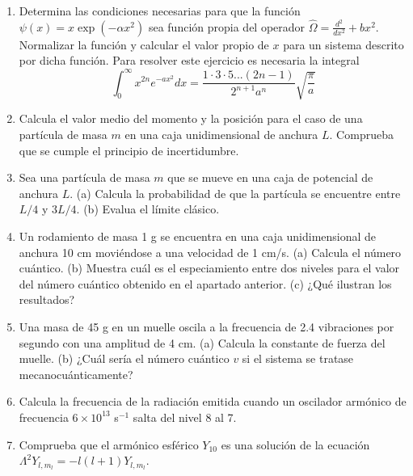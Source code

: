 \documentclass{tufte-handout}
\begin{document}
\begin{enumerate}
   \item Determina las condiciones necesarias 
   para que la función $\psi(x)=x\exp(-\alpha
   x^2)$ sea función propia del operador 
   $\hat{\Omega}=\frac{d^2}{dx^2} + bx^2$.
   Normalizar la función y calcular el valor 
   propio de $x$ para un
   sistema descrito por dicha función. Para resolver
   este ejercicio es necesaria la integral
   \begin{equation}
       \int_0^{\infty}x^{2n}e^{-ax^2}dx = 
       \frac{1\cdot 3\cdot 5... (2n-1)}{2^{n+1}a^n}\sqrt{\frac{\pi}{a}}
   \end{equation}
   
   \item Calcula el valor medio del momento y
   la posición para el caso de una partícula de
   masa $m$ en una caja unidimensional de anchura
   $L$. Comprueba que se cumple el principio de
   incertidumbre.
   
   \item Sea una partícula de masa $m$ que se
   mueve en una caja de potencial de anchura $L$.
   (a) Calcula la probabilidad de que la partícula
   se encuentre entre $L/4$ y $3L/4$. (b) Evalua el
   límite clásico.
   
  \item Un rodamiento de masa 1 g se encuentra
  en una caja unidimensional de anchura 10 cm
  moviéndose a una velocidad de 1 cm/s. (a) Calcula
  el número cuántico. (b) Muestra cuál es el especiamiento
  entre dos niveles para el valor del número cuántico 
  obtenido en el apartado anterior. (c) ¿Qué ilustran los 
  resultados?
  
  \item Una masa de 45 g en un muelle oscila a la 
  frecuencia de 2.4 vibraciones por segundo con 
  una amplitud de 4 cm. (a) Calcula la constante 
  de fuerza del muelle. (b) ¿Cuál sería el número
  cuántico $v$ si el sistema se tratase 
  mecanocuánticamente?
  
  \item Calcula la frecuencia de la radiación emitida
  cuando un oscilador armónico de frecuencia $6\times 10^{13}$
  s$^{-1}$ salta del nivel 8 al 7.
  
  \item Comprueba que el armónico esférico $Y_{10}$ es una solución 
  de la ecuación $\Lambda^2Y_{l,m_l}=-l(l+1)Y_{l,m_l}$.
\end{enumerate}

\newpage
\end{document}
